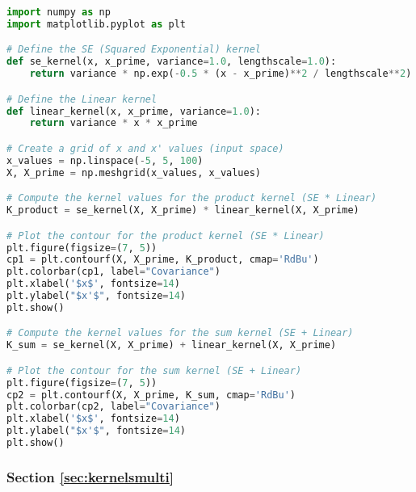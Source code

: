 \documentclass[12pt,a4paper]{article}
\begin{document}
\vspace{10pt}
\begin{lstlisting}[language=python, caption={Code of the Creation of Figure \ref{fig:SELin Contour plots}}]
import numpy as np
import matplotlib.pyplot as plt

# Define the SE (Squared Exponential) kernel
def se_kernel(x, x_prime, variance=1.0, lengthscale=1.0):
    return variance * np.exp(-0.5 * (x - x_prime)**2 / lengthscale**2)

# Define the Linear kernel
def linear_kernel(x, x_prime, variance=1.0):
    return variance * x * x_prime

# Create a grid of x and x' values (input space)
x_values = np.linspace(-5, 5, 100)
X, X_prime = np.meshgrid(x_values, x_values)

# Compute the kernel values for the product kernel (SE * Linear)
K_product = se_kernel(X, X_prime) * linear_kernel(X, X_prime)

# Plot the contour for the product kernel (SE * Linear)
plt.figure(figsize=(7, 5))
cp1 = plt.contourf(X, X_prime, K_product, cmap='RdBu')
plt.colorbar(cp1, label="Covariance")
plt.xlabel('$x$', fontsize=14)
plt.ylabel("$x'$", fontsize=14)
plt.show()

# Compute the kernel values for the sum kernel (SE + Linear)
K_sum = se_kernel(X, X_prime) + linear_kernel(X, X_prime)

# Plot the contour for the sum kernel (SE + Linear)
plt.figure(figsize=(7, 5))
cp2 = plt.contourf(X, X_prime, K_sum, cmap='RdBu')
plt.colorbar(cp2, label="Covariance")
plt.xlabel('$x$', fontsize=14)
plt.ylabel("$x'$", fontsize=14)
plt.show()
\end{lstlisting}

\subsubsection{Section \ref{sec:kernelsmulti}}
\end{document}
